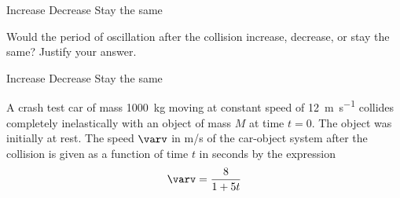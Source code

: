 \documentclass{../../oss-classkick-exam}
\begin{document}
\begin{questions}
\begin{parts}
\begin{subparts}
      \vspace{.1in}
      \underline{\hspace{.3in}} Increase\hspace{.6in}
      \underline{\hspace{.3in}} Decrease\hspace{.6in}
      \underline{\hspace{.3in}} Stay the same

      \subpart Would the period of oscillation after the collision increase,
      decrease, or stay the same? Justify your answer.

      \vspace{.1in}
      \underline{\hspace{.3in}} Increase\hspace{.6in}
      \underline{\hspace{.3in}} Decrease\hspace{.6in}
      \underline{\hspace{.3in}} Stay the same
    \end{subparts}
  \end{parts}
  \newpage
  
  \question A crash test car of mass \SI{1000}{\kilo\gram} moving at constant
  speed of \SI{12}{\metre\per\second} collides completely inelastically with an
  object of mass $M$ at time $t=0$. The object was initially at rest. The speed
  $\varv$ in m/s of the car-object system after the collision is given as a
  function of time $t$ in seconds by the expression
  \begin{displaymath}
    \varv=\frac8{1 + 5t}
  \end{displaymath}
\end{questions}
\end{document}
